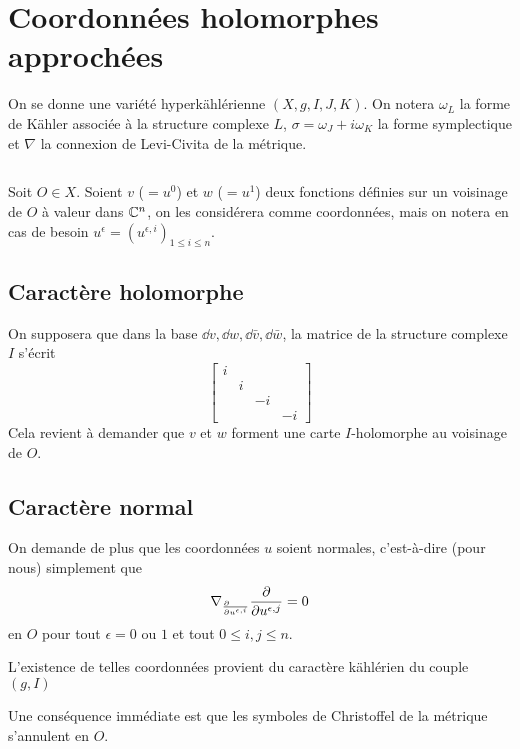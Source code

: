 \documentclass[12pt,draft]{amsart}
\numberwithin{equation}{subsection}
\begin{document}
\section{Coordonnées holomorphes approchées}
On se donne une variété hyperkählérienne $(X,g,I,J,K)$. On notera $\omega_L$ la forme de Kähler associée à la structure complexe $L$, $\sigma = \omega_J +  i \omega_K$ la forme symplectique et $\nabla$ la connexion de Levi-Civita de la métrique.

\subsection{} Soit $O \in X$. Soient $v$ ($=u^0$) et $w$ ($=u^1$) deux fonctions définies sur un voisinage de $O$ à valeur dans $\mathbb{C}^n$, on les considérera comme coordonnées, mais on notera en cas de besoin $u^{\epsilon} = (u^{\epsilon,i})_{1\leq i \leq n}$.

\subsection{Caractère holomorphe}\label{holo} On supposera que dans la base $\dd v, \dd w, \dd \bar{v}, \dd \bar{w}$, la matrice de la structure complexe $I$ s'écrit
\begin{equation}
\begin{bmatrix}
i &  &  &  \\ 
 & i &  &  \\ 
 &  & -i &  \\ 
 &  &  & -i
\end{bmatrix} 
\end{equation}
Cela revient à demander que $v$ et $w$ forment une carte $I$-holomorphe au voisinage de $O$.

\subsection{Caractère normal}\label{normal} On demande de plus que les coordonnées $u$ soient normales, c'est-à-dire (pour nous) simplement que
\begin{equation}
\nabla_{\frac{\partial \hfill}{\partial u^{\epsilon,i}}}\dpp{}{u^{\epsilon,j}} = 0
\end{equation}
en $O$ pour tout $\epsilon = 0$ ou $1$ et tout $0 \leq i,j \leq n$.

L'existence de telles coordonnées provient du caractère kählérien du couple $(g,I)$

Une conséquence immédiate est que les symboles de Christoffel de la métrique s'annulent en $O$.
\end{document}
